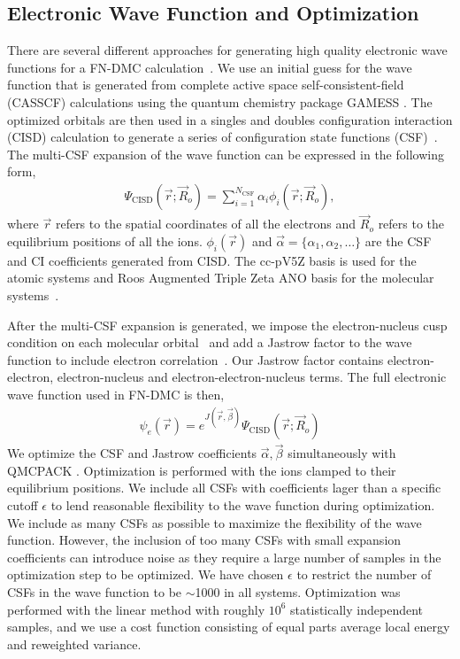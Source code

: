 \documentclass[pra,superscriptaddress,groupedaddress,twocolumn]{revtex4}
\begin{document}
\subsection{Electronic Wave Function and Optimization}
There are several different approaches for generating high quality electronic wave functions for a FN-DMC calculation~\cite{Umrigar_Alleviation,Toulouse_Bench,Brown_Bench,Seth_Bench}. We use an initial guess for the wave function that is generated from complete active space self-consistent-field (CASSCF) \cite{Chaban_MCSCF,Szabo} calculations using the quantum chemistry package GAMESS \cite{GAMESS}. The optimized orbitals are then used in a singles and doubles configuration interaction (CISD) calculation to generate a series of configuration state functions (CSF)~\cite{Clark_Bench}. The multi-CSF expansion of the wave function can be expressed in the following form,
\begin{align}
\Psi_{\text{CISD}}(\vec{r};\vec{R}_o)=\sum\limits_{i=1}^{N_{\text{CSF}}}\alpha_i\phi_i(\vec{r};\vec{R}_o), \label{eq:psi_gms}
\end{align}
where $\vec{r}$ refers to the spatial coordinates of all the electrons and $\vec{R}_o$ refers to the equilibrium positions of all the ions. $\phi_i(\vec{r})$ and $\vec{\alpha}=\{\alpha_1,\alpha_2,\dots\}$ are the CSF and CI coefficients generated from CISD. The cc-pV5Z basis is used for the atomic systems and Roos Augmented Triple Zeta ANO basis for the molecular systems~\cite{dunning,roos}. 

After the multi-CSF expansion is generated, we impose the electron-nucleus cusp condition on each molecular orbital~\cite{cusp} and add a Jastrow factor to the wave function to include electron correlation~\cite{Kato}. Our Jastrow factor contains electron-electron, electron-nucleus and electron-electron-nucleus terms. The full electronic wave function used in FN-DMC is then,
\begin{align}
\psi_e(\vec{r})=e^{J(\vec{r},\vec{\beta})}\Psi_{\text{CISD}}(\vec{r};\vec{R}_o)\label{eq:psie}
\end{align}
We optimize the CSF and Jastrow coefficients $\vec{\alpha},\vec{\beta}$ simultaneously with QMCPACK \cite{QMCPACK}. Optimization is performed with the ions clamped to their equilibrium positions. We include all CSFs with coefficients lager than a specific cutoff $\epsilon$ to lend reasonable flexibility to the wave function during optimization. We include as many CSFs as possible to maximize the flexibility of the wave function. However, the inclusion of too many CSFs with small expansion coefficients can introduce noise as they require a large number of samples in the optimization step to be optimized. We have chosen $\epsilon$ to restrict the number of CSFs in the wave function to be $\sim$1000 in all systems. Optimization was performed with the linear method with roughly $10^6$ statistically independent samples, and we use a cost function consisting of equal parts average local energy and reweighted variance.
\end{document}
